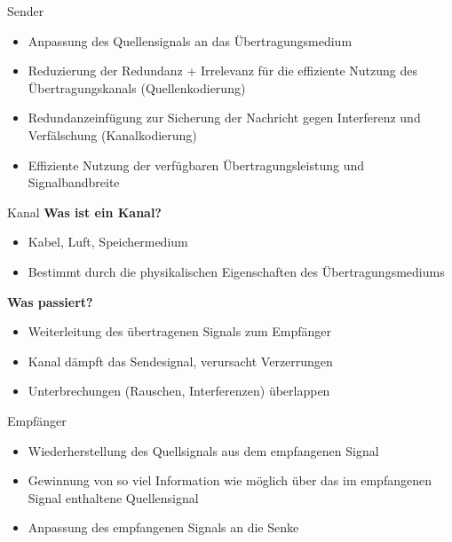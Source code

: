 \documentclass[handout,ngerman]{beamer}
\begin{document}
\begin{frame}{Sender}
	\begin{itemize}
		\item Anpassung des Quellensignals an das \"Ubertragungsmedium\newline
		\item Reduzierung der Redundanz + Irrelevanz für die effiziente Nutzung des \"Ubertragungskanals \alert{(Quellenkodierung)}\newline
		\item Redundanzeinfügung zur Sicherung der Nachricht gegen Interferenz und Verfälschung \alert{(Kanalkodierung)}\newline
		\item Effiziente Nutzung der verf\"ugbaren \"Ubertragungsleistung und Signalbandbreite
	\end{itemize} 	
\end{frame}


\begin{frame}{Kanal}
	\textbf{Was ist ein Kanal?}
	\begin{itemize}
		\item Kabel, Luft, Speichermedium
		\item Bestimmt durch die physikalischen Eigenschaften des Übertragungsmediums
	\end{itemize} 
	\textbf{Was passiert?}
	\begin{itemize}
		\item Weiterleitung des übertragenen Signals zum Empfänger
		\item Kanal dämpft das Sendesignal, verursacht Verzerrungen
		\item Unterbrechungen (Rauschen, Interferenzen) überlappen
		\end{itemize} 	
	\end{frame}


\begin{frame}{Empf\"anger}
	\begin{itemize}
	\item Wiederherstellung des Quellsignals aus dem empfangenen Signal\newline
	\item Gewinnung von so viel Information wie möglich über das im empfangenen Signal enthaltene Quellensignal\newline
	\item Anpassung des empfangenen Signals an die Senke
	\end{itemize} 
\end{frame}
\end{document}
